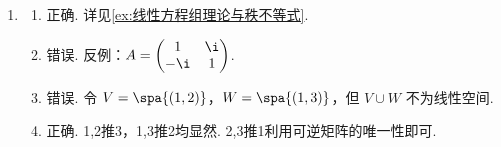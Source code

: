 \begin{enumerate}
    \item \begin{enumerate}
        \item 正确. 详见\autoref{ex:线性方程组理论与秩不等式}.
        \item 错误. 反例：$A=\begin{pmatrix}
            1 & \i \\
            -\i & 1
        \end{pmatrix}$.
        \item 错误. 令 $V=\spa\{(1,2)\}$，$W=\spa\{(1,3)\}$，但 $V \cup W$ 不为线性空间.
        \item 正确. 1,2推3，1,3推2均显然. 2,3推1利用可逆矩阵的唯一性即可.
    \end{enumerate}
\end{enumerate}

\clearpage
